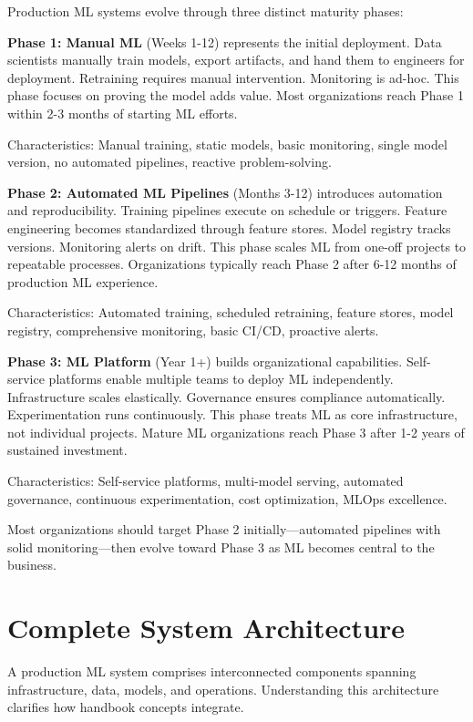 Production ML systems evolve through three distinct maturity phases:

\textbf{Phase 1: Manual ML} (Weeks 1-12) represents the initial deployment. Data scientists manually train models, export artifacts, and hand them to engineers for deployment. Retraining requires manual intervention. Monitoring is ad-hoc. This phase focuses on proving the model adds value. Most organizations reach Phase 1 within 2-3 months of starting ML efforts.

Characteristics: Manual training, static models, basic monitoring, single model version, no automated pipelines, reactive problem-solving.

\textbf{Phase 2: Automated ML Pipelines} (Months 3-12) introduces automation and reproducibility. Training pipelines execute on schedule or triggers. Feature engineering becomes standardized through feature stores. Model registry tracks versions. Monitoring alerts on drift. This phase scales ML from one-off projects to repeatable processes. Organizations typically reach Phase 2 after 6-12 months of production ML experience.

Characteristics: Automated training, scheduled retraining, feature stores, model registry, comprehensive monitoring, basic CI/CD, proactive alerts.

\textbf{Phase 3: ML Platform} (Year 1+) builds organizational capabilities. Self-service platforms enable multiple teams to deploy ML independently. Infrastructure scales elastically. Governance ensures compliance automatically. Experimentation runs continuously. This phase treats ML as core infrastructure, not individual projects. Mature ML organizations reach Phase 3 after 1-2 years of sustained investment.

Characteristics: Self-service platforms, multi-model serving, automated governance, continuous experimentation, cost optimization, MLOps excellence.

Most organizations should target Phase 2 initially---automated pipelines with solid monitoring---then evolve toward Phase 3 as ML becomes central to the business.

\section{Complete System Architecture}

A production ML system comprises interconnected components spanning infrastructure, data, models, and operations. Understanding this architecture clarifies how handbook concepts integrate.

